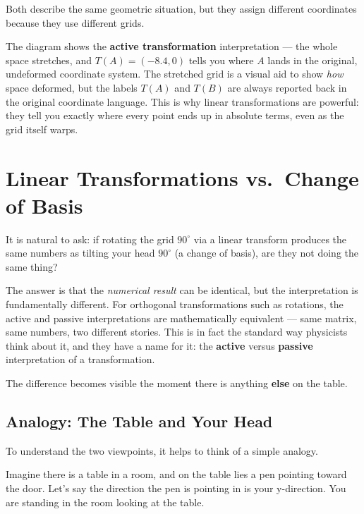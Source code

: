 \documentclass[11pt,openany]{book}
\theoremstyle{definition}
\begin{document}
Both describe the same geometric situation, but they assign different coordinates because 
they use different grids.

\medskip

The diagram shows the \textbf{active transformation} interpretation --- the whole space 
stretches, and $T(A) = (-8.4, 0)$ tells you where $A$ lands in the original, undeformed 
coordinate system. The stretched grid is a visual aid to show \textit{how} space deformed, 
but the labels $T(A)$ and $T(B)$ are always reported back in the original coordinate language. 
This is why linear transformations are powerful: they tell you exactly where every point 
ends up in absolute terms, even as the grid itself warps.

\section{Linear Transformations vs.\ Change of Basis}

It is natural to ask: if rotating the grid $90^\circ$ via a linear transform produces the 
same numbers as tilting your head $90^\circ$ (a change of basis), are they not doing the 
same thing?

\medskip

The answer is that the \textit{numerical result} can be identical, but the interpretation 
is fundamentally different. For orthogonal transformations such as rotations, the active 
and passive interpretations are mathematically equivalent --- same matrix, same numbers, 
two different stories. This is in fact the standard way physicists think about it, and they 
have a name for it: the \textbf{active} versus \textbf{passive} interpretation of a 
transformation.

\medskip

The difference becomes visible the moment there is anything \textbf{else} on the table. 
\subsection{Analogy: The Table and Your Head}

To understand the two viewpoints, it helps to think of a simple analogy.

\medskip

Imagine there is a table in a room, and on the table lies a pen pointing toward the door. Let's say the direction the pen is pointing in is your y-direction.
You are standing in the room looking at the table.
\end{document}
